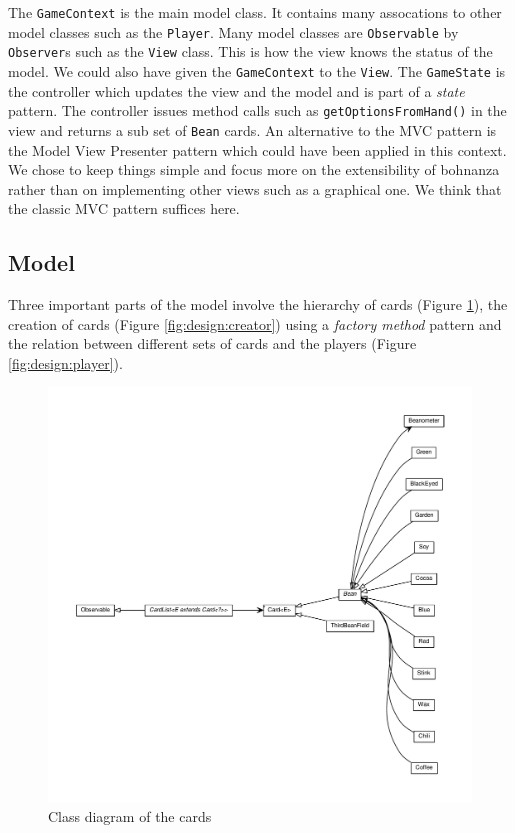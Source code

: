 The \texttt{GameContext} is the main model class. It contains many assocations to other model classes such as the \texttt{Player}. Many
model classes are \texttt{Observable} by \texttt{Observer}s such as the \texttt{View} class. This is how the view knows the status of the
model. We could also have given the \texttt{GameContext} to the \texttt{View}. The \texttt{GameState} is the controller which updates the
view and the model and is part of a \emph{state} pattern. The controller issues method calls such as \texttt{getOptionsFromHand()} in the
view and returns a sub set of \texttt{Bean} cards. An alternative to the MVC pattern is
the Model View Presenter pattern which could have been applied in this context. We chose to keep things simple and focus more on the
extensibility of bohnanza rather than on implementing other views such as a graphical one. We think that the classic MVC pattern suffices here.
 
\subsection{Model}
Three important parts of the model involve the hierarchy of cards (Figure \ref{fig:design:cards}),
the creation of cards (Figure \ref{fig:design:creator}) using a \emph{factory method} pattern and
the relation between different sets of cards and the players (Figure \ref{fig:design:player}). 

 \begin{figure}[h!]
    \includegraphics[width=\textwidth]{../umlgraph/CardGraph}
    \caption{Class diagram of the cards}
    \label{fig:design:cards}
\end{figure}

